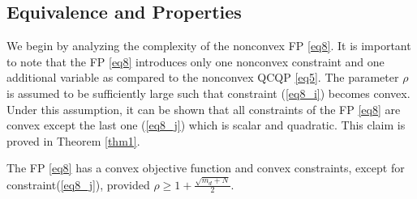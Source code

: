 \documentclass[smallextended,referee,envcountsect,,numbers]{svjour3}
\begin{document}
\subsection{Equivalence and Properties}
We begin by analyzing the complexity of the nonconvex FP \eqref{eq8}. It is important to note that the FP \eqref{eq8} introduces only one nonconvex constraint  and one additional variable as compared to the nonconvex QCQP \eqref{eq5}. The parameter $\rho$ is assumed to be sufficiently large such that constraint (\ref{eq8_i}) becomes convex. Under this assumption, it can be shown that all constraints of the FP \eqref{eq8} are convex except the last one (\ref{eq8_j}) which is scalar and quadratic. This claim is proved in Theorem \ref{thm1}.
\begin{theorem} \label{thm1}
The FP \eqref{eq8} has a convex objective function and convex constraints, except for constraint(\ref{eq8_j}), provided $\rho \ge 1+\frac{\sqrt{m_d+N}}{2}$.
\end{theorem}
\end{document}
